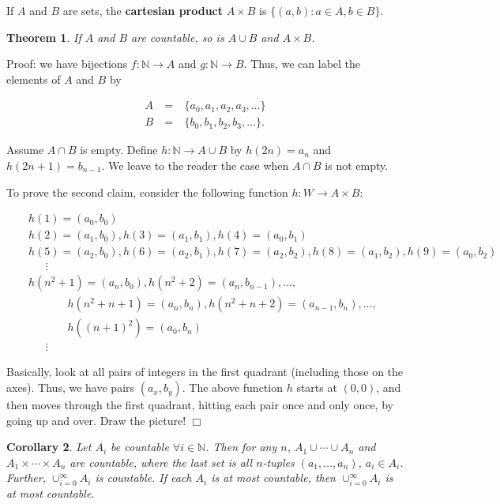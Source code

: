 \documentclass[12pt,letterpaper]{report}
\newcommand\bea{\begin{eqnarray}}
\newcommand\eea{\end{eqnarray}}
\newcommand{\N}{\mathbb{N}}
\newtheorem{thm}{Theorem}[section]
\newtheorem{cor}[thm]{Corollary}
\begin{document}
If $A$ and $B$ are sets, the \textbf{cartesian product} $A \times
B$ is $\{(a,b):a\in A, b\in B\}$.

\begin{thm}\label{thmcountableab} If $A$ and $B$ are countable, so is
$A \cup B$ and $A \times B$. \end{thm}

Proof: we have bijections $f:\N \rightarrow A$ and $g:\N
\rightarrow B$. Thus, we can label the elements of $A$ and $B$ by

\bea A & \ = \ & \{a_0, a_1, a_2, a_3, \dots \} \nonumber\\  B & \
= \ & \{b_0, b_1, b_2, b_3, \dots \}. \eea

Assume $A \cap B$ is empty. Define $h:\N \rightarrow A \cup B $ by
$h(2n) = a_n$ and $h(2n+1) = b_{n-1}$. We leave to the reader the
case when $A \cap B$ is not empty.

To prove the second claim, consider the following function $h: W
\rightarrow A \times B$:

\bea & & h(1) = (a_0,b_0) \nonumber\\ & & h(2) = (a_1,b_0), h(3) =
(a_1,b_1), h(4) = (a_0,b_1) \nonumber\\ & & h(5) = (a_2,b_0), h(6)
=  (a_2,b_1), h(7) = (a_2,b_2), h(8) = (a_1,b_2), h(9) = (a_0,b_2)
\nonumber\\ & & \ \ \ \ \ \  \ \vdots \nonumber\\ & & h(n^2+1) =
(a_n,b_0), h(n^2+2) = (a_n,b_{n-1}), \dots, \nonumber\\ & & \ \ \
\ \ \ \ \ \ \ \ \ \ \ \ \ h(n^2+n+1) = (a_n,b_n), h(n^2+n+2) =
(a_{n-1},b_n), \dots, \nonumber\\ & & \ \ \ \ \ \ \ \ \ \ \ \ \ \
\ \ h((n+1)^2) = (a_0,b_n) \nonumber\\ & & \ \ \ \ \ \  \ \vdots
\eea

Basically, look at all pairs of integers in the first quadrant
(including those on the axes). Thus, we have pairs $(a_x,b_y)$.
The above function $h$ starts at $(0,0)$, and then moves through
the first quadrant, hitting each pair once and only once, by going
up and over. Draw the picture! $\Box$

\begin{cor}\label{corcountable} Let $A_i$ be countable $\forall i \in \N$. Then
for any $n$, $A_1 \cup \cdots \cup A_n$ and $A_1 \times \cdots
\times A_n$ are countable, where the last set is all $n$-tuples
$(a_1,\dots,a_n)$, $a_i \in A_i$. Further, $\cup_{i=0}^\infty A_i$
is countable. If each $A_i$ is at most countable, then
$\cup_{i=0}^\infty A_i$ is at most countable.
\end{cor}
\end{document}
